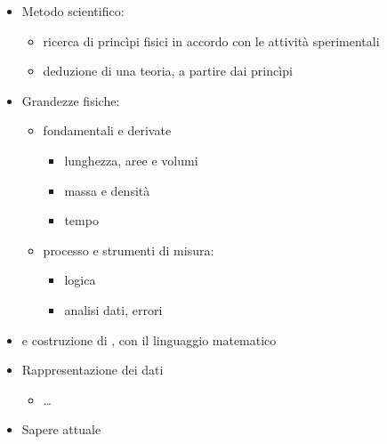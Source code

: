\documentclass[letterpaper,10pt,italian]{jupyterBook}
\begin{document}
\sphinxAtStartPar
{}
\begin{itemize}
\item {} 
\sphinxAtStartPar
Metodo scientifico:
\begin{itemize}
\item {} 
\sphinxAtStartPar
ricerca di princìpi fisici in accordo con le attività sperimentali

\item {} 
\sphinxAtStartPar
deduzione di una teoria, a partire dai princìpi

\end{itemize}

\item {} 
\sphinxAtStartPar
Grandezze fisiche:
\begin{itemize}
\item {} 
\sphinxAtStartPar
fondamentali e derivate
\begin{itemize}
\item {} 
\sphinxAtStartPar
lunghezza, aree e volumi

\item {} 
\sphinxAtStartPar
massa e densità

\item {} 
\sphinxAtStartPar
tempo

\end{itemize}

\item {} 
\sphinxAtStartPar
processo e strumenti di misura:
\begin{itemize}
\item {} 
\sphinxAtStartPar
logica  

\item {} 
\sphinxAtStartPar
analisi dati, errori

\end{itemize}

\end{itemize}

\item {} 
\sphinxAtStartPar
{} e costruzione di , con il linguaggio matematico

\item {} 
\sphinxAtStartPar
Rappresentazione dei dati
\begin{itemize}
\item {} 
\sphinxAtStartPar
…

\end{itemize}

\item {} 
\sphinxAtStartPar
Sapere attuale

\end{itemize}
\end{document}

